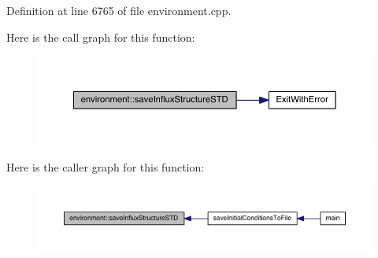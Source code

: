 Definition at line 6765 of file environment.\-cpp.



Here is the call graph for this function\-:
\nopagebreak
\begin{figure}[H]
\begin{center}
\leavevmode
\includegraphics[width=350pt]{a00014_a8f831e2db11fa5d840484345dac64fc7_cgraph}
\end{center}
\end{figure}




Here is the caller graph for this function\-:
\nopagebreak
\begin{figure}[H]
\begin{center}
\leavevmode
\includegraphics[width=350pt]{a00014_a8f831e2db11fa5d840484345dac64fc7_icgraph}
\end{center}
\end{figure}


